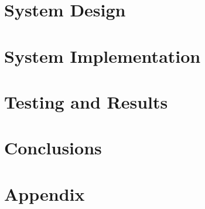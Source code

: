\documentclass[12pt]{article}
\begin{document}

\newpage

\doublespacing

\tableofcontents %
\newpage

\begin{small} %
\listoffigures %
\end{small}
\newpage 



\newpage


\newpage

\newpage

\section{System Design}

\newpage
\section{System Implementation}


\newpage 
\section{Testing and Results}




\newpage 
\section{Conclusions}

\newpage
\singlespacing
\doublespacing
\newpage

\section{Appendix} %

\newpage

\newpage

\newpage

\newpage


\end{document}
